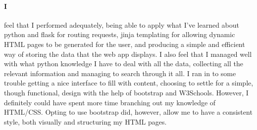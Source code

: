 \documentclass[10pt, a4paper]{article}
\begin{document}
    \paragraph{I} feel that I performed adequately, being able to apply what I've learned about python and flask for routing requests, jinja templating for allowing dynamic HTML pages to be generated for the user, and producing a simple and efficient way of storing the data that the web app displays. I also feel that I managed well with what python knowledge I have to deal with all the data, collecting all the relevant information and managing to search through it all. I ran in to some trouble getting a nice interface to fill with content, choosing to settle for a simple, though functional, design with the help of bootstrap\cite{Bootstrap} and W3Schools\cite{W3Schools}. However, I definitely could have spent more time branching out my knowledge of HTML/CSS. Opting to use bootstrap\cite{Bootstrap} did, however, allow me to have a consistent style, both visually and structuring my HTML pages.
    
    
    
		
\end{document}
